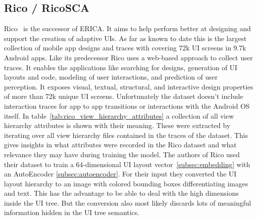 


\subsection{Rico / RicoSCA}
\label{subsec:rico}

Rico~\cite{deka2017rico} is the successor of ERICA.
It aims to help perform better at designing and support the creation of adaptive UIs.
As far as known to date this is the largest collection of mobile app designs and traces with covering 72k UI screens in 9.7k Android apps.
Like its predecessor Rico uses a web-based approach to collect user traces.
It enables the applications like searching for designs, generation of UI layouts and code, modeling of user interactions, and prediction of user perception.
It exposes visual, textual, structural, and interactive design properties of more than 72k unique UI screens.
Unfortunately the dataset doesn't include interaction traces for app to app transitions or interactions with the Android OS itself.
In table~\ref{tab:rico_view_hierarchy_attributes} a collection of all view hierarchy attributes is shown with their meaning.
These were extracted by iterating over all view hierarchy files contained in the traces of the dataset.
This gives insights in what attributes were recorded in the Rico dataset and what relevance they may have during training the model.
The authors of Rico used their dataset to train a 64-dimensional UI layout vector~\ref{subsec:embedding} with an AutoEncoder \ref{subsec:autoencoder}.
For their input they converted the UI layout hierarchy to an image with colored bounding boxes differentiating images and text.
This has the advantage to be able to deal with the high dimensions inside the UI tree.
But the conversion also most likely discards lots of meaningful information hidden in the UI tree semantics.


